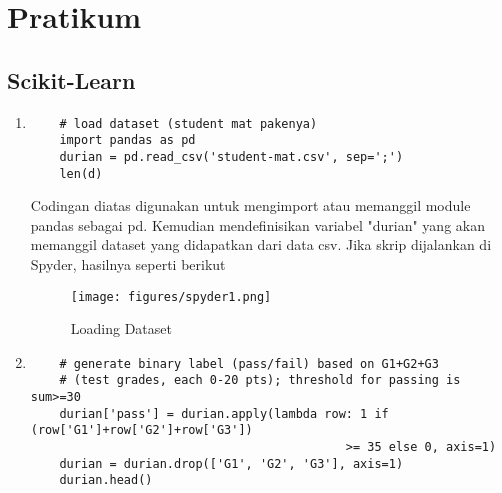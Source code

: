 \section{Pratikum}
\subsection{Scikit-Learn}
\begin{enumerate}

\item
\begin{verbatim}
	# load dataset (student mat pakenya)
	import pandas as pd
	durian = pd.read_csv('student-mat.csv', sep=';')
	len(d)
\end{verbatim}

\par
Codingan diatas digunakan untuk mengimport atau memanggil module pandas sebagai pd. Kemudian mendefinisikan variabel "durian" yang akan memanggil dataset yang didapatkan dari data csv. Jika skrip dijalankan di Spyder, hasilnya seperti berikut 
\begin{figure}[ht]
\centering
\texttt{[image: figures/spyder1.png]}
\caption{Loading Dataset}
\label{Spyder}
\end{figure}
\item
\begin{verbatim}
	# generate binary label (pass/fail) based on G1+G2+G3 
	# (test grades, each 0-20 pts); threshold for passing is sum>=30
	durian['pass'] = durian.apply(lambda row: 1 if (row['G1']+row['G2']+row['G3']) 
											>= 35 else 0, axis=1)
	durian = durian.drop(['G1', 'G2', 'G3'], axis=1)
	durian.head()
\end{verbatim}


\end{enumerate}

